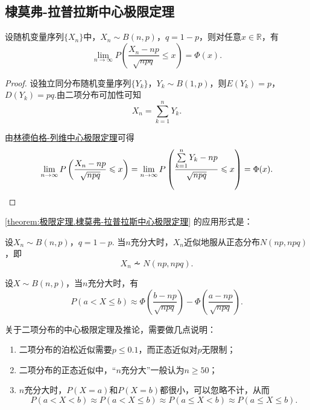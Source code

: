 \subsection{棣莫弗-拉普拉斯中心极限定理}
\begin{theorem}\label{theorem:极限定理.棣莫弗-拉普拉斯中心极限定理}
设随机变量序列\(\{X_n\}\)中，\(X_n \sim B(n,p)\)，\(q = 1-p\)，则对任意\(x \in \mathbb{R}\)，有\[
\lim\limits_{n\to\infty} P\left( \frac{X_n - np}{\sqrt{npq}} \leqslant x \right) = \Phi(x).
\]
\begin{proof}
设独立同分布随机变量序列\(\{Y_k\}\)，\(Y_k \sim B(1,p)\)，则\(E(Y_k)=p\)，\(D(Y_k)=pq\).由二项分布可加性可知\[
X_n = \sum\limits_{k=1}^n{Y_k}.
\]

由\hyperref[theorem:极限定理.林德伯格-列维中心极限定理]{林德伯格-列维中心极限定理}可得\[
\lim\limits_{n\to\infty} P\left(\frac{X_n-np}{\sqrt{npq}} \leqslant x\right)
= \lim\limits_{n\to\infty} P\left(\frac{\sum\limits_{k=1}^n{Y_k}-np}{\sqrt{npq}} \leqslant x\right)
= \Phi(x).
\qedhere
\]
\end{proof}
\end{theorem}

\cref{theorem:极限定理.棣莫弗-拉普拉斯中心极限定理} 的应用形式是：
\begin{corollary}
设\(X_n \sim B(n,p)\)，\(q = 1-p\).
当\(n\)充分大时，\(X_n\)近似地服从正态分布\(N(np,npq)\)，即\[
X_n \dotsim N(np,npq).
\]
\end{corollary}

\begin{corollary}
设\(X \sim B(n,p)\)，当\(n\)充分大时，有\[
P(a < X \leqslant b)
\approx \Phi\left(\frac{b-np}{\sqrt{npq}}\right) - \Phi\left(\frac{a-np}{\sqrt{npq}}\right).
\]
\end{corollary}

关于二项分布的中心极限定理及推论，需要做几点说明：
\begin{enumerate}
\item 二项分布的泊松近似需要\(p \leqslant 0.1\)，而正态近似对\(p\)无限制；
\item 二项分布的正态近似中，“\(n\)充分大”一般认为\(n \geqslant 50\)；
\item \(n\)充分大时，\(P(X=a)\)和\(P(X=b)\)都很小，可以忽略不计，从而\[
P(a < X < b)
\approx P(a < X \leqslant b)
\approx P(a \leqslant X < b)
\approx P(a \leqslant X \leqslant b).
\]
\end{enumerate}
